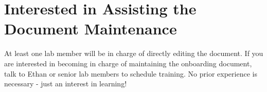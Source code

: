 \documentclass[
]{book}
\begin{document}
\hypertarget{interested-in-assisting-the-document-maintenance}{%
\section{Interested in Assisting the Document Maintenance}\label{interested-in-assisting-the-document-maintenance}}

At least one lab member will be in charge of directly editing the document. If you are interested in becoming in charge of maintaining the onboarding document, talk to Ethan or senior lab members to schedule training. No prior experience is necessary - just an interest in learning!

  
\end{document}
